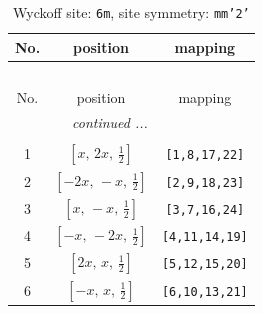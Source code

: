 \documentclass[fleqn,8pt]{jsarticle}
\begin{document}
\renewcommand{\arraystretch}{1.2}
\begin{longtable}{ccc}
\caption{Wyckoff site: {\tt 6m}, site symmetry: {\tt mm'2'}}
 \\
 \hline \hline
No. & position & mapping \\ \hline \endfirsthead

\multicolumn{2}{l}{\tablename\ \thetable{}} \\
 \hline \hline
No. & position & mapping \\ \hline \endhead

 \hline \hline
\multicolumn{2}{r}{\footnotesize\it continued ...} \\ \endfoot

 \hline \hline
\multicolumn{2}{r}{} \\ \endlastfoot

1 & $\left[ x,\, 2 x,\, \frac{1}{2} \right]$ & {\tt [1,8,17,22]} \\ \hline
2 & $\left[ - 2 x,\, - x,\, \frac{1}{2} \right]$ & {\tt [2,9,18,23]} \\ \hline
3 & $\left[ x,\, - x,\, \frac{1}{2} \right]$ & {\tt [3,7,16,24]} \\ \hline
4 & $\left[ - x,\, - 2 x,\, \frac{1}{2} \right]$ & {\tt [4,11,14,19]} \\ \hline
5 & $\left[ 2 x,\, x,\, \frac{1}{2} \right]$ & {\tt [5,12,15,20]} \\ \hline
6 & $\left[ - x,\, x,\, \frac{1}{2} \right]$ & {\tt [6,10,13,21]} \\
\end{longtable}
\renewcommand{\arraystretch}{1.2}
\end{document}
